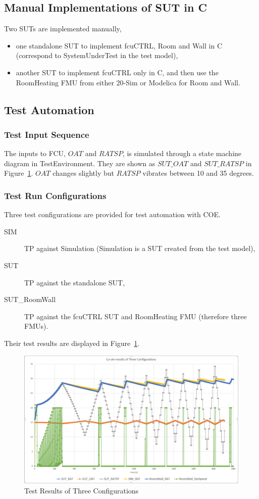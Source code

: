 \subsection{Manual Implementations of SUT in C}
Two SUTs are implemented manually,
\begin{itemize}
    \item one standalone SUT to implement fcuCTRL, Room and Wall in C (correspond to SystemUnderTest in the test model),
    \item another SUT to implement fcuCTRL only in C, and then use the RoomHeating FMU from either 20-Sim or Modelica for Room and Wall.
\end{itemize}

\subsection{Test Automation}
\subsubsection{Test Input Sequence}
The inputs to FCU, $OAT$ and $RATSP$, is simulated through a state machine diagram in TestEnvironment. They are shown as $SUT\_OAT$ and $SUT\_RATSP$ in Figure~\ref{fig:fcu_co-sim-result}. $OAT$ changes slightly but $RATSP$ vibrates between 10 and 35 degrees.

\subsubsection{Test Run Configurations}
Three test configurations are provided for test automation with COE.
\begin{description}
    \item[SIM] TP against Simulation (Simulation is a SUT created from the test model), 
    \item[SUT] TP against the standalone SUT, 
    \item[SUT\_RoomWall] TP against the fcuCTRL SUT and RoomHeating FMU (therefore three FMUs).
\end{description}

Their test results are displayed in Figure~\ref{fig:fcu_co-sim-result}.
\begin{figure}[htb!]
    \centering
	\includegraphics[width=1.0\textwidth]{test_results-20170621/fcu_co-sim-result}
    \caption{Test Results of Three Configurations}
    \label{fig:fcu_co-sim-result}
\end{figure}

